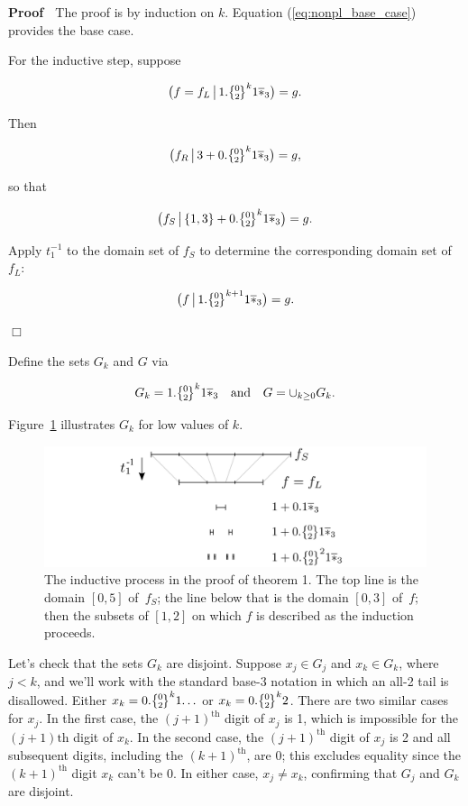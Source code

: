 \documentclass[20pt,]{extarticle}
\begin{document}
\textbf{Proof} \(\;\) The proof is by induction on \(k\). Equation
(\ref{eq:nonpl_base_case}) provides the base case.

For the inductive step, suppose

\[\big(f=f_L \restrict 1.\zerotwo^k1\lstar \big) = g.\]

Then

\[\big(f_R \restrict 3 + 0.\zerotwo^k1\lstar \big) = g,\]

so that

\[\big(f_S \restrict \{1,3\} + 0.\zerotwo^k1\lstar \big) = g.\]

Apply \(t_1^{-1}\) to the domain set of \(f_S\) to determine the
corresponding domain set of \(f_L\):

\[\big(f \restrict 1.\zerotwo^{k+1}1\lstar \big) = g.\]

\hfill\(\Box\)

Define the sets \(G_k\) and \(G\) via

\begin{equation}G_k = 1.\zerotwo^k1\lstar \quad\text{and}\quad
  G = \cup_{k \ge 0}G_k.\label{eq:Gk_G}\end{equation}

Figure~\ref{fig:nonpl_process} illustrates \(G_k\) for low values of
\(k\).

\begin{figure}
\centering
\includegraphics{images/nonpl_process.png}
\caption{The inductive process in the proof of theorem 1. The top line
is the domain \([0,5]\) of \(\,f_S\); the line below that is the domain
\([0,3]\) of \(\,f;\) then the subsets of \([1,2]\) on which \(f\) is
described as the induction proceeds.}\label{fig:nonpl_process}
\end{figure}

Let's check that the sets \(G_k\) are disjoint. Suppose \(x_j\in G_j\)
and \(x_k\in G_k\), where \(j < k\), and we'll work with the standard
base-3 notation in which an all-2 tail is disallowed. Either
\(x_k=0.\zerotwo^k1\!\ldots\) or \(x_k=0.\zerotwo^k2\). There are two
similar cases for \(x_j\). In the first case, the \((j+1)^\text{th}\)
digit of \(x_j\) is 1, which is impossible for the \((j+1)\text{th}\)
digit of \(x_k\). In the second case, the \((j+1)^\text{th}\) digit of
\(x_j\) is 2 and all subsequent digits, including the
\((k+1)^\text{th}\), are 0; this excludes equality since the
\((k+1)^\text{th}\) digit \(x_k\) can't be 0. In either case,
\(x_j\ne x_k\), confirming that \(G_j\) and \(G_k\) are disjoint.
\end{document}
